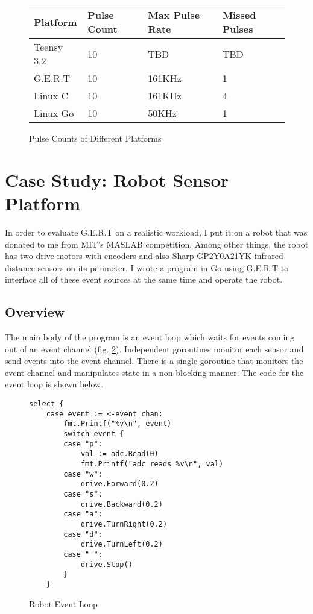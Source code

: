 \begin{figure} [h]
\begin{center}
  \begin{tabular}{ | l | l | l | l |}
    \hline
    Platform & Pulse Count & Max Pulse Rate & Missed Pulses \\ \hline
    Teensy 3.2 & 10 & TBD & TBD \\ \hline
    G.E.R.T & 10 & 161KHz & 1 \\ \hline
    Linux C & 10 & 161KHz & 4 \\ \hline
    Linux Go & 10 & 50KHz & 1 \\
    \hline
  \end{tabular}
\end{center}
  \caption{Pulse Counts of Different Platforms}  \label{fig:counter}
\end{figure}

\clearpage
\section{Case Study: Robot Sensor Platform} \label{sec:robot}
In order to evaluate G.E.R.T on a realistic workload, I put it on a robot that was
donated to me from MIT's MASLAB competition. Among other things, the robot has two drive
motors with encoders and also Sharp GP2Y0A21YK infrared distance sensors on its perimeter.
I wrote a program in Go using G.E.R.T to interface all of these event sources at the same time
and operate the robot.

\subsection{Overview}
The main body of the program is an event loop which waits for events coming out of an event channel (fig. \ref{fig:event_loop}).
Independent goroutines monitor each sensor and send events into the event channel. There is a
single goroutine that monitors the event channel and manipulates state in a non-blocking manner. The code for the
event loop is shown below.

\begin{figure}[h]
  \begin{center}
\begin{lstlisting}
select {
	case event := <-event_chan:
		fmt.Printf("%v\n", event)
		switch event {
		case "p":
			val := adc.Read(0)
			fmt.Printf("adc reads %v\n", val)
		case "w":
			drive.Forward(0.2)
		case "s":
			drive.Backward(0.2)
		case "a":
			drive.TurnRight(0.2)
		case "d":
			drive.TurnLeft(0.2)
		case " ":
			drive.Stop()
		}
	}
\end{lstlisting}
\end{center}
  \caption{Robot Event Loop} \label{fig:event_loop}
\end{figure}

